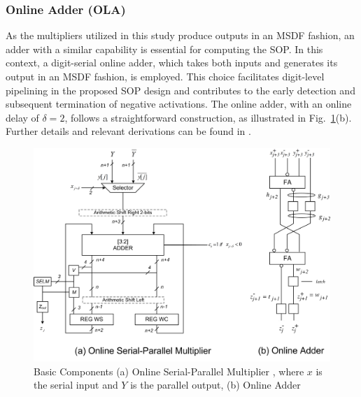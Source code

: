 \documentclass[conference]{IEEEtran}
\begin{document}
\subsubsection{Online Adder (OLA)} \label{sec: Online_adder}
As the multipliers utilized in this study produce outputs in an MSDF fashion, an adder with a similar capability is essential for computing the SOP. In this context, a digit-serial online adder, which takes both inputs and generates its output in an MSDF fashion, is employed. This choice facilitates digit-level pipelining in the proposed SOP design and contributes to the early detection and subsequent termination of negative activations. The online adder, with an online delay of $\delta = 2$, follows a straightforward construction, as illustrated in Fig.~\ref{fig:mult_add}(b).
Further details and relevant derivations can be found in \cite{ercegovac2004digital}.

\begin{figure}[!htb]
    \centering
    \includegraphics[width=\linewidth]{mult_add.png}
    \caption{Basic Components (a) Online Serial-Parallel Multiplier \cite{usman2023low}, where $x$ is the serial input and $Y$ is the parallel output, (b) Online Adder \cite{ercegovac2004digital}}
    \label{fig:mult_add}
\end{figure}
\end{document}
